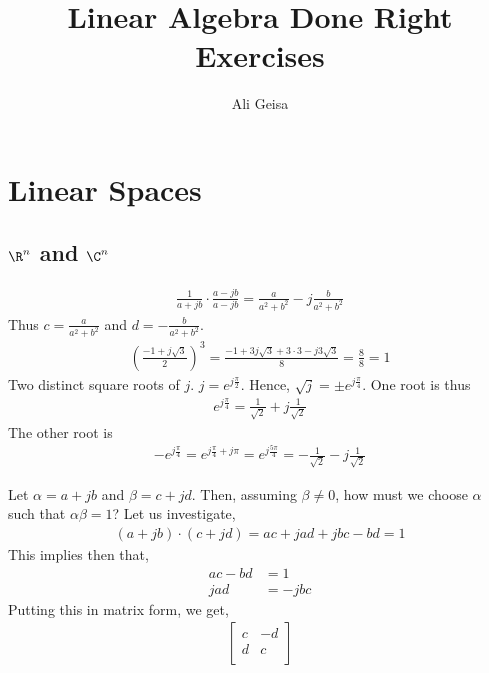 \documentclass{book}
\begin{document}
\author{Ali Geisa}
\title{Linear Algebra Done Right Exercises}
\chapter{Linear Spaces}
\section{$\R^n$ and $\C^n$}
  \begin{enumerate}[label=\arabic*)]
    \ii 
      \begin{align*}
        \frac{1}{a + jb}\cdot\frac{a - jb}{a - jb} = \frac{a}{a^2 + b^2} - j\frac{b}{a^2 + b^2}
      \end{align*}
      Thus $c = \frac{a}{a^2 + b^2}$ and $d = -\frac{b}{a^2 + b^2}$.
    \ii
      \begin{align*}
        (\frac{-1 + j\sqrt{3}}{2})^3 = \frac{-1 + 3j\sqrt{3} + 3\cdot3 - j3\sqrt{3}}{8} = \frac{8}{8} = 1
      \end{align*}
    \ii
      Two distinct square roots of $j$. $j = e^{j\frac{\pi}{2}}$. Hence, $\sqrt{j} = \pm e^{j\frac{\pi}{4}}$. One root is thus 
      \begin{align*}
        e^{j\frac{\pi}{4}} = \frac{1}{\sqrt{2}} + j\frac{1}{\sqrt{2}}
      \end{align*}
      The other root is 
      \begin{align*}
        -e^{j\frac{\pi}{4}} = e^{j\frac{\pi}{4} + j\pi} = e^{j\frac{5\pi}{4}} = -\frac{1}{\sqrt{2}} - j\frac{1}{\sqrt{2}}
      \end{align*}
    \addtocounter{enumi}{3}
    \ii
      Let $\alpha = a + jb$ and $\beta = c + jd$. Then, assuming $\beta \neq 0$, how must we choose $\alpha$ such that $\alpha\beta = 1$? Let us investigate,
      \begin{align*}
        (a + jb)\cdot(c + jd) = ac + jad + jbc - bd = 1
      \end{align*}
      This implies then that,
      \begin{align*}
        ac - bd &= 1 \\
        jad & = - jbc
      \end{align*}
      Putting this in matrix form, we get, 
      \begin{align*}
        \begin{bmatrix}
          c & -d \\
          d & c \\
        \end{bmatrix}

\end{align*}
\end{enumerate}
\end{document}
